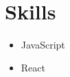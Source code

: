 \documentclass[10pt]{article}
\begin{document}
\\
\vspace{4mm}
\section*{Skills}
\begin{itemize}
  \item JavaScript
  \item React
\end{itemize}
\end{document}
